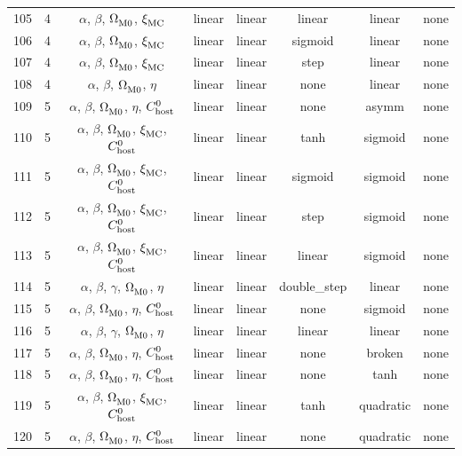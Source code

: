 \begin{longtable}{c c c c c c c c}
    105 & 4 & $\alpha$, $\beta$, $\Omega_{\rm M0}^{}$, $\xi_{\rm MC}^{}$ & linear & linear & linear & linear & none \\
    106 & 4 & $\alpha$, $\beta$, $\Omega_{\rm M0}^{}$, $\xi_{\rm MC}^{}$ & linear & linear & sigmoid & linear & none \\
    107 & 4 & $\alpha$, $\beta$, $\Omega_{\rm M0}^{}$, $\xi_{\rm MC}^{}$ & linear & linear & step & linear & none \\
    108 & 4 & $\alpha$, $\beta$, $\Omega_{\rm M0}^{}$, $\eta$ & linear & linear & none & linear & none \\
    109 & 5 & $\alpha$, $\beta$, $\Omega_{\rm M0}^{}$, $\eta$, $C_{\rm host}^{0}$ & linear & linear & none & asymm & none \\
    110 & 5 & $\alpha$, $\beta$, $\Omega_{\rm M0}^{}$, $\xi_{\rm MC}^{}$, $C_{\rm host}^{0}$ & linear & linear & tanh & sigmoid & none \\
    111 & 5 & $\alpha$, $\beta$, $\Omega_{\rm M0}^{}$, $\xi_{\rm MC}^{}$, $C_{\rm host}^{0}$ & linear & linear & sigmoid & sigmoid & none \\
    112 & 5 & $\alpha$, $\beta$, $\Omega_{\rm M0}^{}$, $\xi_{\rm MC}^{}$, $C_{\rm host}^{0}$ & linear & linear & step & sigmoid & none \\
    113 & 5 & $\alpha$, $\beta$, $\Omega_{\rm M0}^{}$, $\xi_{\rm MC}^{}$, $C_{\rm host}^{0}$ & linear & linear & linear & sigmoid & none \\
    114 & 5 & $\alpha$, $\beta$, $\gamma$, $\Omega_{\rm M0}^{}$, $\eta$ & linear & linear & double\_step & linear & none \\
    115 & 5 & $\alpha$, $\beta$, $\Omega_{\rm M0}^{}$, $\eta$, $C_{\rm host}^{0}$ & linear & linear & none & sigmoid & none \\
    116 & 5 & $\alpha$, $\beta$, $\gamma$, $\Omega_{\rm M0}^{}$, $\eta$ & linear & linear & linear & linear & none \\
    117 & 5 & $\alpha$, $\beta$, $\Omega_{\rm M0}^{}$, $\eta$, $C_{\rm host}^{0}$ & linear & linear & none & broken & none \\
    118 & 5 & $\alpha$, $\beta$, $\Omega_{\rm M0}^{}$, $\eta$, $C_{\rm host}^{0}$ & linear & linear & none & tanh & none \\
    119 & 5 & $\alpha$, $\beta$, $\Omega_{\rm M0}^{}$, $\xi_{\rm MC}^{}$, $C_{\rm host}^{0}$ & linear & linear & tanh & quadratic & none \\
    120 & 5 & $\alpha$, $\beta$, $\Omega_{\rm M0}^{}$, $\eta$, $C_{\rm host}^{0}$ & linear & linear & none & quadratic & none \\

\end{longtable}
